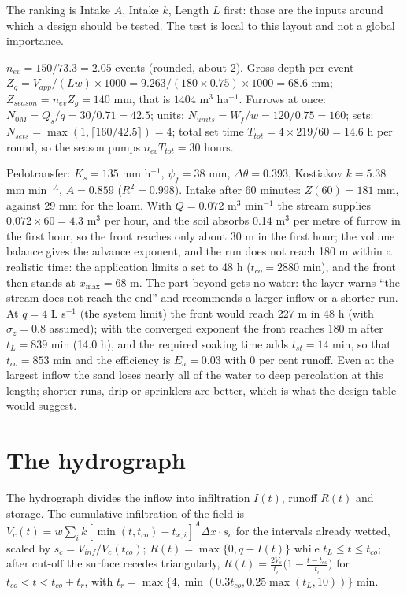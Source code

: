 The ranking is Intake $A$, Intake $k$, Length $L$ first: those are the inputs around which a design should be tested. The test is local to this layout and not a global importance.


\sol  $n_{ev}=150/73.3=2.05$ events (rounded, about 2). Gross depth per event $Z_g=V_{app}/(Lw)\times1000=9.263/(180\times0.75)\times1000=68.6$ mm; $Z_{season}=n_{ev}Z_g=140$ mm, that is $1404$ m$^3$ ha$^{-1}$. Furrows at once: $N_{0M}=Q_s/q=30/0.71=42.5$; units: $N_{units}=W_f/w=120/0.75=160$; sets: $N_{sets}=\max(1,\lceil160/42.5\rceil)=4$; total set time $T_{tot}=4\times219/60=14.6$ h per round, so the season pumps $n_{ev}T_{tot}=30$ hours.


\sol  Pedotransfer: $K_s=135$ mm h$^{-1}$, $\psi_f=38$ mm, $\Delta\theta=0.393$, Kostiakov $k=5.38$ mm min$^{-A}$, $A=0.859$ ($R^2=0.998$). Intake after 60 minutes: $Z(60)=181$ mm, against $29$ mm for the loam. With $Q=0.072$ m$^3$ min$^{-1}$ the stream supplies $0.072\times60=4.3$ m$^3$ per hour, and the soil absorbs 0.14 m$^3$ per metre of furrow in the first hour, so the front reaches only about 30 m in the first hour; the volume balance gives the advance exponent, and the run does not reach 180 m within a realistic time: the application limits a set to 48 h ($t_{co}=2880$ min), and the front then stands at $x_{\max}=68$ m. The part beyond gets no water: the layer warns ``the stream does not reach the end'' and recommends a larger inflow or a shorter run. At $q=4$ L s$^{-1}$ (the system limit) the front would reach 227 m in 48 h (with $\sigma_z=0.8$ assumed); with the converged exponent the front reaches 180 m after $t_L=839$ min (14.0 h), and the required soaking time adds $t_{st}=14$ min, so that $t_{co}=853$ min and the efficiency is $E_a=0.03$ with $0$ per cent runoff. Even at the largest inflow the sand loses nearly all of the water to deep percolation at this length; shorter runs, drip or sprinklers are better, which is what the design table would suggest.


\section{The hydrograph}
The hydrograph divides the inflow into infiltration $I(t)$, runoff $R(t)$ and storage. The cumulative infiltration of the field is $V_c(t)=w\sum_ik[\min(t,t_{co})-\bar t_{x,i}]^A\Delta x\cdot s_c$ for the intervals already wetted, scaled by $s_c=V_{inf}/V_c(t_{co})$; $R(t)=\max\{0,q-I(t)\}$ while $t_L\le t\le t_{co}$; after cut-off the surface recedes triangularly, $R(t)=\frac{2V_s}{t_r}\bigl(1-\frac{t-t_{co}}{t_r}\bigr)$ for $t_{co}<t<t_{co}+t_r$, with $t_r=\max\{4,\min(0.3t_{co},0.25\max(t_L,10))\}$ min.

